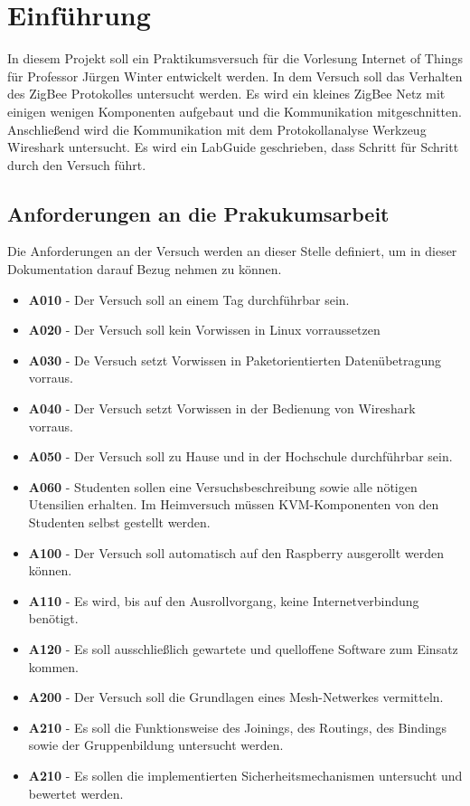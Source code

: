 \chapter{Einführung}

In diesem Projekt soll ein Praktikumsversuch für die Vorlesung Internet of Things für Professor Jürgen Winter 
entwickelt werden. In dem Versuch soll das Verhalten des ZigBee Protokolles untersucht werden. Es wird ein kleines
ZigBee Netz mit einigen wenigen Komponenten aufgebaut und die Kommunikation mitgeschnitten. Anschließend wird die
Kommunikation mit dem Protokollanalyse Werkzeug Wireshark untersucht. Es wird ein \grqq LabGuide \grqq{} geschrieben,
dass Schritt für Schritt durch den Versuch führt.

\section{Anforderungen an die Prakukumsarbeit}

Die Anforderungen an der Versuch werden an dieser Stelle definiert, um in dieser Dokumentation 
darauf Bezug nehmen zu können.
\begin{itemize}
    \item \textbf{A010} - Der Versuch soll an einem Tag durchführbar sein.
    \item \textbf{A020} - Der Versuch soll kein Vorwissen in Linux vorraussetzen
    \item \textbf{A030} - De Versuch setzt Vorwissen in Paketorientierten Datenübetragung vorraus.
    \item \textbf{A040} - Der Versuch setzt Vorwissen in der Bedienung von Wireshark vorraus.
    \item \textbf{A050} - Der Versuch soll zu Hause und in der Hochschule durchführbar sein.
    \item \textbf{A060} - Studenten sollen eine Versuchsbeschreibung sowie alle nötigen Utensilien erhalten. Im Heimversuch müssen KVM-Komponenten von den Studenten selbst gestellt werden.
    \item \textbf{A100} - Der Versuch soll automatisch auf den Raspberry ausgerollt werden können.
    \item \textbf{A110} - Es wird, bis auf den Ausrollvorgang, keine Internetverbindung benötigt.
    \item \textbf{A120} - Es soll ausschließlich gewartete und quelloffene Software zum Einsatz kommen.
    \item \textbf{A200} - Der Versuch soll die Grundlagen eines Mesh-Netwerkes vermitteln.
    \item \textbf{A210} - Es soll die Funktionsweise des Joinings, des Routings, des Bindings sowie der Gruppenbildung untersucht werden.
    \item \textbf{A210} - Es sollen die implementierten Sicherheitsmechanismen untersucht und bewertet werden.
\end{itemize}

